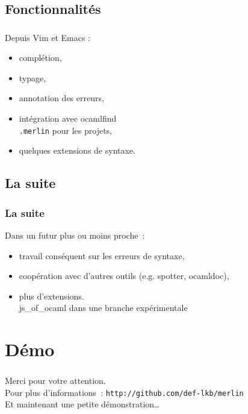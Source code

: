 \documentclass{beamer}
\newcommand{\sectitle}{\frametitle{\insertsection}}
\begin{document}
\subsection{Fonctionnalités}

\begin{frame}
  \sectitle

  Depuis Vim et Emacs :

  \begin{itemize}
    \item complétion,
    \item typage,
    \item annotation des erreurs,
    \item intégration avec ocamlfind \\
      {\small {\tt .merlin} pour les projets},
    \item quelques extensions de syntaxe.
  \end{itemize}

\end{frame}

\subsection{La suite}

\begin{frame}
  \frametitle{La suite}

  Dans un futur plus ou moins proche :

  \begin{itemize}
    \item travail conséquent sur les erreurs de syntaxe,
      \pause
    \item coopération avec d'autres outils (e.g. spotter, ocamldoc),
      \pause
    \item plus d'extensions. \\
      {\small js\_of\_ocaml dans une branche expérimentale}
  \end{itemize}

\end{frame}

\section*{Démo}

\begin{frame}
 \sectitle
 
 Merci pour votre attention. \\

 Pour plus d'informations : {\tt http://github.com/def-lkb/merlin} \\

 Et maintenant une petite démonstration…
 
\end{frame}
\end{document}
